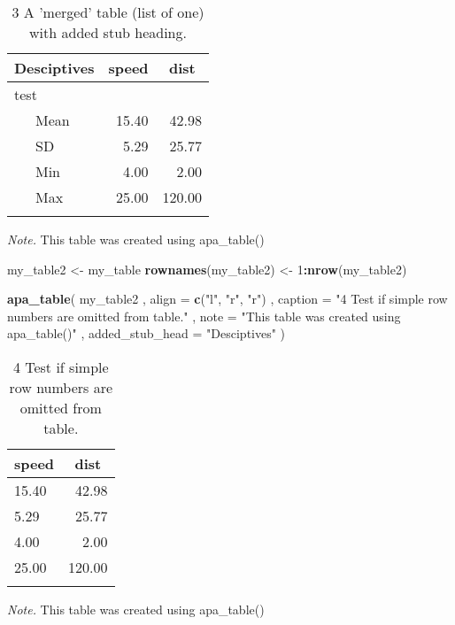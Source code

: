 \documentclass[man]{apa6}
\newenvironment{Shaded}{\begin{snugshade}}{\end{snugshade}}
\newcommand{\KeywordTok}[1]{\textcolor[rgb]{0.13,0.29,0.53}{\textbf{#1}}}
\newcommand{\DataTypeTok}[1]{\textcolor[rgb]{0.13,0.29,0.53}{#1}}
\newcommand{\DecValTok}[1]{\textcolor[rgb]{0.00,0.00,0.81}{#1}}
\newcommand{\StringTok}[1]{\textcolor[rgb]{0.31,0.60,0.02}{#1}}
\newcommand{\OperatorTok}[1]{\textcolor[rgb]{0.81,0.36,0.00}{\textbf{#1}}}
\newcommand{\NormalTok}[1]{#1}
\begin{document}
\begin{table}[tbp]
\begin{center}
\begin{threeparttable}
\caption{\label{tab:unnamed-chunk-5}3 A 'merged' table (list of one) with added stub heading.}
\begin{tabular}{lrr}
\toprule
Desciptives & \multicolumn{1}{c}{speed} & \multicolumn{1}{c}{dist}\\
\midrule
test &  & \\
\ \ \ Mean & 15.40 & 42.98\\
\ \ \ SD & 5.29 & 25.77\\
\ \ \ Min & 4.00 & 2.00\\
\ \ \ Max & 25.00 & 120.00\\
\bottomrule
\addlinespace
\end{tabular}
\begin{tablenotes}[para]
\textit{Note.} This table was created using apa\_table()
\end{tablenotes}
\end{threeparttable}
\end{center}
\end{table}

\begin{Shaded}
\begin{Highlighting}[]
\NormalTok{my_table2 <-}\StringTok{ }\NormalTok{my_table}
\KeywordTok{rownames}\NormalTok{(my_table2) <-}\StringTok{ }\DecValTok{1}\OperatorTok{:}\KeywordTok{nrow}\NormalTok{(my_table2)}

\KeywordTok{apa_table}\NormalTok{(}
\NormalTok{  my_table2}
\NormalTok{  , }\DataTypeTok{align =} \KeywordTok{c}\NormalTok{(}\StringTok{"l"}\NormalTok{, }\StringTok{"r"}\NormalTok{, }\StringTok{"r"}\NormalTok{)}
\NormalTok{  , }\DataTypeTok{caption =} \StringTok{"4 Test if simple row numbers are omitted from table."}
\NormalTok{  , }\DataTypeTok{note =} \StringTok{"This table was created using apa_table()"}
\NormalTok{  , }\DataTypeTok{added_stub_head =} \StringTok{"Desciptives"}
\NormalTok{)}
\end{Highlighting}
\end{Shaded}

\begin{table}[tbp]
\begin{center}
\begin{threeparttable}
\caption{\label{tab:unnamed-chunk-5}4 Test if simple row numbers are omitted from table.}
\begin{tabular}{lr}
\toprule
speed & \multicolumn{1}{c}{dist}\\
\midrule
15.40 & 42.98\\
5.29 & 25.77\\
4.00 & 2.00\\
25.00 & 120.00\\
\bottomrule
\addlinespace
\end{tabular}
\begin{tablenotes}[para]
\textit{Note.} This table was created using apa\_table()
\end{tablenotes}
\end{threeparttable}
\end{center}
\end{table}
\end{document}
